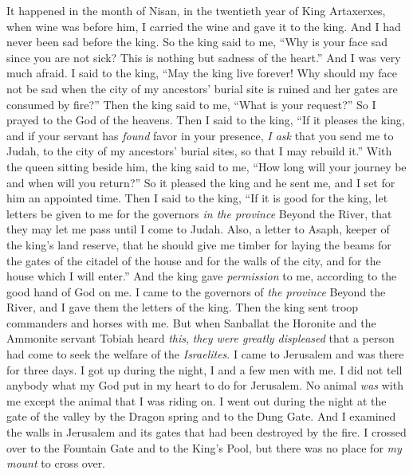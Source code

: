 \begin{biblechapter} %
 It happened in the month of Nisan, in the twentieth year of King Artaxerxes, when wine was before him, I carried the wine and gave it to the king. And I had never been sad before the king.
\verse So the king said to me, “Why is your face sad since you are not sick? This is nothing but sadness of the heart.” And I was very much afraid.
\verse I said to the king, “May the king live forever! Why should my face not be sad when the city of my ancestors’ burial site is ruined and her gates are consumed by fire?”
\verse Then the king said to me, “What is your request?” So I prayed to the God of the heavens.
\verse Then I said to the king, “If it pleases the king, and if your servant has \textit{found} favor in your presence, \textit{I ask} that you send me to Judah, to the city of my ancestors’ burial sites, so that I may rebuild it.”
\verse With the queen sitting beside him, the king said to me, “How long will your journey be and when will you return?” So it pleased the king and he sent me, and I set for him an appointed time.
\verse Then I said to the king, “If it is good for the king, let letters be given to me for the governors \textit{in the province} Beyond the River, that they may let me pass until I come to Judah.
\verse Also, a letter to Asaph, keeper of the king’s land reserve, that he should give me timber for laying the beams for the gates of the citadel of the house and for the walls of the city, and for the house which I will enter.” And the king gave \textit{permission} to me, according to the good hand of God on me.
\verse I came to the governors of \textit{the province} Beyond the River, and I gave them the letters of the king. Then the king sent troop commanders and horses with me.
\verse But when Sanballat the Horonite and the Ammonite servant Tobiah heard \textit{this}, \textit{they were greatly displeased} that a person had come to seek the welfare of the \textit{Israelites}.
 I came to Jerusalem and was there for three days.
\verse I got up during the night, I and a few men with me. I did not tell anybody what my God put in my heart to do for Jerusalem. No animal \textit{was} with me except the animal that I was riding on.
\verse I went out during the night at the gate of the valley by the Dragon spring and to the Dung Gate. And I examined the walls in Jerusalem and its gates that had been destroyed by the fire.
\verse I crossed over to the Fountain Gate and to the King’s Pool, but there was no place for \textit{my mount} to cross over.

\end{biblechapter}
